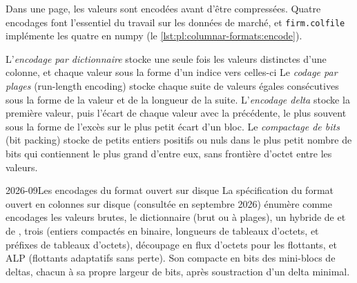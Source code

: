 Dans une page, les valeurs sont encodées avant d'être compressées. Quatre encodages font l'essentiel du travail sur les données de marché, et
\texttt{firm.colfile} implémente les quatre en numpy (le \cref{lst:pl:columnar-formats:encode}).

\begin{definition}\label{def:pl:columnar-formats:encodings}
L'\emph{encodage par dictionnaire} stocke une seule fois les valeurs distinctes d'une colonne, et chaque valeur sous la forme d'un indice vers celles-ci
Le \emph{codage par plages} (run-length encoding) stocke chaque suite de valeurs égales consécutives sous la forme
de la valeur et de la longueur de la suite. L'\emph{encodage delta} stocke la première valeur, puis l'écart de chaque valeur avec la précédente,
le plus souvent sous la forme de l'excès sur le plus petit écart d'un bloc. Le \emph{compactage de bits} (bit packing) stocke de petits
entiers positifs ou nuls dans le plus petit nombre de bits qui contiennent le plus grand d'entre eux, sans frontière d'octet entre les valeurs.
\end{definition}

\label{lst:pl:columnar-formats:encode}

\begin{dated}{2026-09}{Les encodages du format ouvert sur disque}\label{dat:pl:columnar-formats:encodings}
La spécification du format ouvert en colonnes sur disque (consultée en septembre 2026) énumère comme encodages les valeurs brutes, le dictionnaire (brut ou
à plages), un hybride de  et de , trois  (entiers compactés en binaire, longueurs de tableaux d'octets,
et préfixes de tableaux d'octets), découpage en flux d'octets pour les flottants, et ALP (flottants adaptatifs sans perte). Son 
compacte en bits des mini-blocs de deltas, chacun à sa propre largeur de bits, après soustraction d'un delta minimal.
\end{dated}

